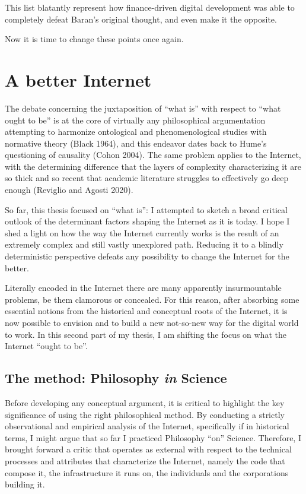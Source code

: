 \documentclass[
  a4paper,
]{book}
\begin{document}
This list blatantly represent how finance-driven digital development was able to completely defeat Baran’s original thought, and even make it the opposite.

Now it is time to change these points once again.

\hypertarget{a-better-internet}{%
\chapter{A better Internet}\label{a-better-internet}}

The debate concerning the juxtaposition of ``what is'' with respect to ``what ought to be'' is at the core of virtually any philosophical argumentation attempting to harmonize ontological and phenomenological studies with normative theory {(Black 1964)}, and this endeavor dates back to Hume's questioning of causality {(Cohon 2004)}. The same problem applies to the Internet, with the determining difference that the layers of complexity characterizing it are so thick and so recent that academic literature struggles to effectively go deep enough {(Reviglio and Agosti 2020)}.

So far, this thesis focused on ``what is'': I attempted to sketch a broad critical outlook of the determinant factors shaping the Internet as it is today. I hope I shed a light on how the way the Internet currently works is the result of an extremely complex and still vastly unexplored path. Reducing it to a blindly deterministic perspective defeats any possibility to change the Internet for the better.

Literally encoded in the Internet there are many apparently insurmountable problems, be them clamorous or concealed. For this reason, after absorbing some essential notions from the historical and conceptual roots of the Internet, it is now possible to envision and to build a new not-so-new way for the digital world to work. In this second part of my thesis, I am shifting the focus on what the Internet ``ought to be''.

\hypertarget{the-method-philosophy-in-science}{%
\section{\texorpdfstring{The method: Philosophy \emph{in} Science}{The method: Philosophy in Science}}\label{the-method-philosophy-in-science}}

Before developing any conceptual argument, it is critical to highlight the key significance of using the right philosophical method. By conducting a strictly observational and empirical analysis of the Internet, specifically if in historical terms, I might argue that so far I practiced Philosophy ``on'' Science. Therefore, I brought forward a critic that operates as external with respect to the technical processes and attributes that characterize the Internet, namely the code that compose it, the infrastructure it runs on, the individuals and the corporations building it.
\end{document}
